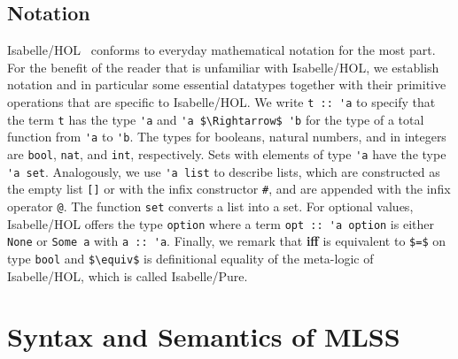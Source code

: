 \documentclass[sigplan,10pt,anonymous,review]{acmart}
\begin{document}
\subsection{Notation}
Isabelle/HOL~\cite{isabelle} conforms to everyday mathematical notation for the most part.
For the benefit of the reader that is unfamiliar with Isabelle/HOL, we establish notation and in particular some essential datatypes together with their primitive operations that are specific to Isabelle/HOL.
We write \lstinline!t :: 'a! to specify that the term \lstinline!t! has the type \lstinline!'a! and \lstinline!'a $\Rightarrow$ 'b! for the type of a total function from \lstinline!'a! to \lstinline!'b!.
The types for booleans, natural numbers, and in integers are \lstinline!bool!, \lstinline!nat!, and \lstinline!int!, respectively.
Sets with elements of type \lstinline!'a! have the type \lstinline!'a set!.
Analogously, we use \lstinline!'a list! to describe lists, which are constructed as the empty list \lstinline![]! or with the infix constructor \lstinline!#!, and are appended with the infix operator \lstinline!@!.
The function \lstinline!set! converts a list into a set.
For optional values, Isabelle/HOL offers the type \lstinline!option! where a term \lstinline!opt :: 'a option! is either \lstinline!None! or \lstinline!Some a! with \lstinline!a :: 'a!.
Finally, we remark that \textbf{iff} is equivalent to \lstinline!$=$! on type \lstinline!bool! and \lstinline!$\equiv$! is definitional equality of the meta-logic of Isabelle/HOL, which is called Isabelle/Pure.
\section{Syntax and Semantics of MLSS\label{sec:semantics}}
\end{document}
